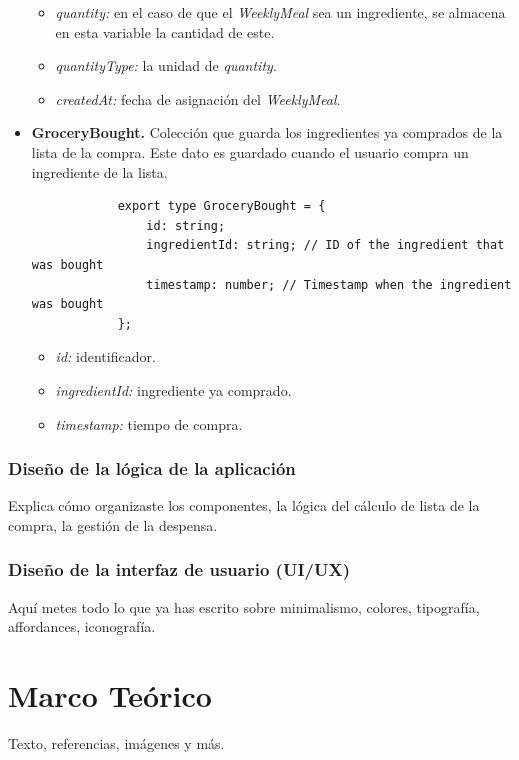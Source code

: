 \documentclass[12pt,a4paper]{report} %
\begin{document}
\begin{itemize}
\begin{itemize}
			\item \textit{quantity:} en el caso de que el \textit{WeeklyMeal} sea un ingrediente, se almacena en esta variable la cantidad de este.
			\item \textit{quantityType:} la unidad de \textit{quantity}.
			\item \textit{createdAt:} fecha de asignación del \textit{WeeklyMeal}.
		\end{itemize}
	\item \textbf{GroceryBought.} Colección que guarda los ingredientes ya comprados de la lista de la compra. Este dato es guardado cuando el usuario compra un ingrediente de la lista.
		\begin{lstlisting}
			export type GroceryBought = {
				id: string;
				ingredientId: string; // ID of the ingredient that was bought
				timestamp: number; // Timestamp when the ingredient was bought
			};
		\end{lstlisting}
		\begin{itemize}
			\item \textit{id:} identificador.
			\item \textit{ingredientId:} ingrediente ya comprado.
			\item \textit{timestamp:} tiempo de compra.
		\end{itemize}
		
		
		
		
			
\end{itemize}
	
	
	\subsection*{Diseño de la lógica de la aplicación}
	Explica cómo organizaste los componentes, la lógica del cálculo de lista de la compra, la gestión de la despensa.	
	\subsection*{Diseño de la interfaz de usuario (UI/UX)}
	Aquí metes todo lo que ya has escrito sobre minimalismo, colores, tipografía, affordances, iconografía.
	
	
	
	\chapter{Marco Teórico}
	Texto, referencias, imágenes y más.
	
\end{document}

